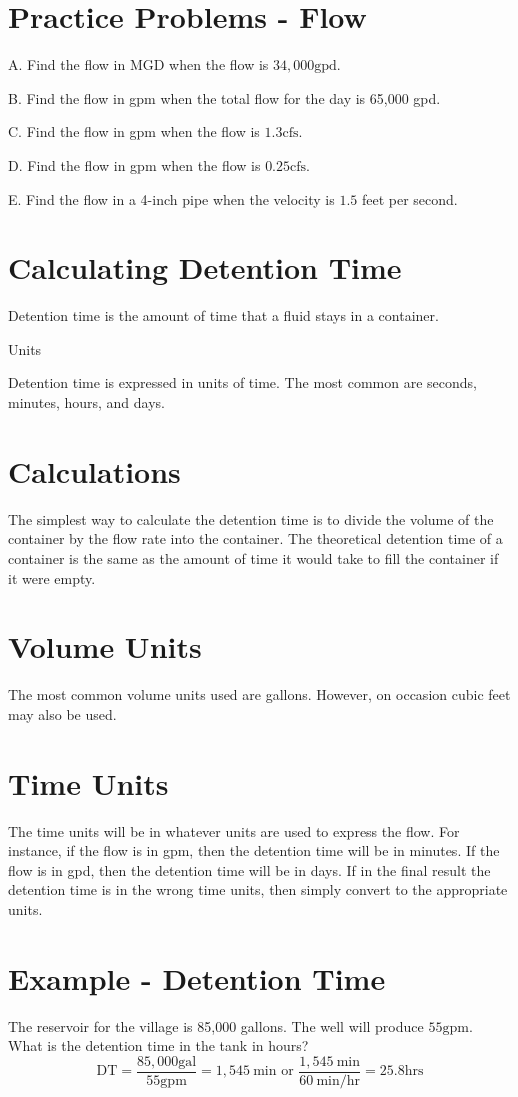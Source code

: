 \section{Practice Problems - Flow}
A. Find the flow in MGD when the flow is $34,000 \mathrm{gpd}$.

B. Find the flow in gpm when the total flow for the day is 65,000 gpd.

C. Find the flow in gpm when the flow is $1.3 \mathrm{cfs}$.

D. Find the flow in gpm when the flow is $0.25 \mathrm{cfs}$.

E. Find the flow in a 4-inch pipe when the velocity is $1.5$ feet per second.

\section{Calculating Detention Time}
Detention time is the amount of time that a fluid stays in a container.

Units

Detention time is expressed in units of time. The most common are seconds, minutes, hours, and days.

\section{Calculations}
The simplest way to calculate the detention time is to divide the volume of the container by the flow rate into the container. The theoretical detention time of a container is the same as the amount of time it would take to fill the container if it were empty.

\section{Volume Units}
The most common volume units used are gallons. However, on occasion cubic feet may also be used.

\section{Time Units}
The time units will be in whatever units are used to express the flow. For instance, if the flow is in gpm, then the detention time will be in minutes. If the flow is in gpd, then the detention time will be in days. If in the final result the detention time is in the wrong time units, then simply convert to the appropriate units.

\section{Example - Detention Time}
The reservoir for the village is 85,000 gallons. The well will produce $55 \mathrm{gpm}$. What is the detention time in the tank in hours?
$$
\mathrm{DT}=\frac{85,000 \mathrm{gal}}{55 \mathrm{gpm}}=1,545 \mathrm{~min} \text { or } \frac{1,545 \mathrm{~min}}{60 \mathrm{~min} / \mathrm{hr}}=25.8 \mathrm{hrs}
$$

